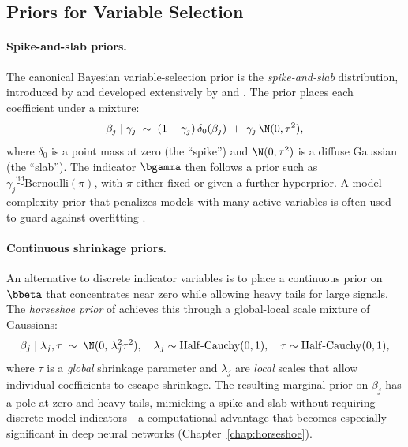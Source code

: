\subsection{Priors for Variable Selection}
\label{subsec:vs-priors}

\paragraph{Spike-and-slab priors.}
The canonical Bayesian variable-selection prior is the
\emph{spike-and-slab} distribution, introduced by
\citet{mitchell1988spikeand} and developed extensively by
\citet{george1993vs} and \citet{george1997approaches}. The prior places
each coefficient under a mixture:
\begin{equation}
  \beta_j \mid \gamma_j
  \;\sim\;
  (1 - \gamma_j)\,\delta_0(\beta_j)
  \;+\;
  \gamma_j\,\N(0, \tau^2),
  \label{eq:spike-slab}
\end{equation}
where $\delta_0$ is a point mass at zero (the ``spike'') and $\N(0,\tau^2)$
is a diffuse Gaussian (the ``slab''). The indicator $\bgamma$ then follows
a prior such as $\gamma_j \overset{\mathrm{iid}}{\sim}
\mathrm{Bernoulli}(\pi)$, with $\pi$ either fixed or given a further
hyperprior. A model-complexity prior that penalizes models with many active
variables is often used to guard against overfitting \citep{scott2010bayes}.

\paragraph{Continuous shrinkage priors.}
An alternative to discrete indicator variables is to place a continuous
prior on $\bbeta$ that concentrates near zero while allowing heavy tails
for large signals. The \emph{horseshoe prior} of
\citet{carvalho2010horseshoe} achieves this through a global-local scale
mixture of Gaussians:
\begin{equation}
  \beta_j \mid \lambda_j, \tau
  \;\sim\;
  \N(0,\, \lambda_j^2 \tau^2),
  \quad
  \lambda_j \sim \mathrm{Half\text{-}Cauchy}(0,1),
  \quad
  \tau \sim \mathrm{Half\text{-}Cauchy}(0,1),
  \label{eq:horseshoe}
\end{equation}
where $\tau$ is a \emph{global} shrinkage parameter and $\lambda_j$ are
\emph{local} scales that allow individual coefficients to escape shrinkage.
The resulting marginal prior on $\beta_j$ has a pole at zero and heavy
tails, mimicking a spike-and-slab without requiring discrete model
indicators---a computational advantage that becomes especially significant
in deep neural networks (Chapter~\ref{chap:horseshoe}).


